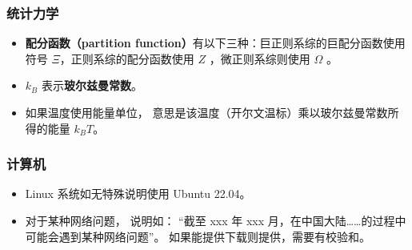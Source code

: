 \subsubsection{统计力学}
\begin{itemize}
\item \textbf{配分函数（partition function）}有以下三种：巨正则系综的巨配分函数使用符号 $\Xi$，正则系综的配分函数使用 $Z$ ，微正则系综则使用 $\Omega$ 。
\item $k_B$ 表示\textbf{玻尔兹曼常数}。%
\item 如果温度使用能量单位， 意思是该温度（开尔文温标）乘以玻尔兹曼常数所得的能量 $k_B T$。
\end{itemize}

\subsubsection{计算机}
\begin{itemize}
\item Linux 系统如无特殊说明使用 Ubuntu 22.04。
\item 对于某种网络问题， 说明如： “截至 xxx 年 xxx 月，在中国大陆……的过程中可能会遇到某种网络问题”。 如果能提供下载则提供，需要有校验和。
\end{itemize}
